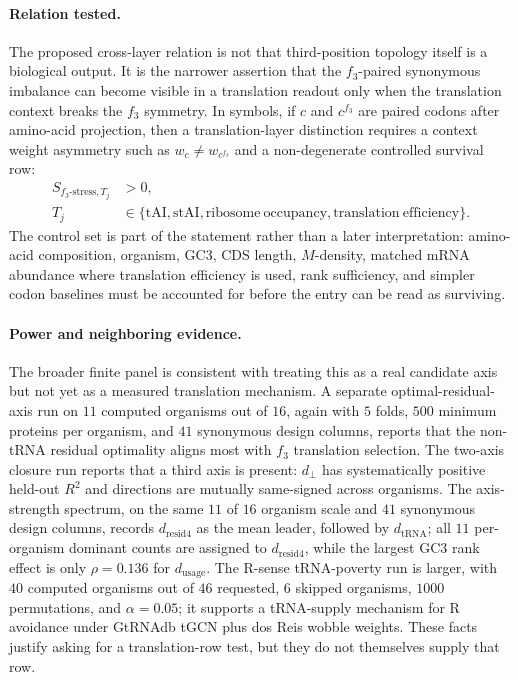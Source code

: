 \paragraph{Relation tested.}
The proposed cross-layer relation is not that third-position topology itself is a biological output.  It is the narrower assertion that the $f_3$-paired synonymous imbalance can become visible in a translation readout only when the translation context breaks the $f_3$ symmetry.  In symbols, if $c$ and $c^{f_3}$ are paired codons after amino-acid projection, then a translation-layer distinction requires a context weight asymmetry such as $w_c \ne w_{c^{f_3}}$ and a non-degenerate controlled survival row:
$$\begin{aligned}
S_{f_3\text{-stress},T_j} &> 0,\\
T_j &\in \{\mathrm{tAI},\mathrm{stAI},\mathrm{ribosome\ occupancy},\mathrm{translation\ efficiency}\}.
\end{aligned}$$
The control set is part of the statement rather than a later interpretation: amino-acid composition, organism, GC3, CDS length, $M$-density, matched mRNA abundance where translation efficiency is used, rank sufficiency, and simpler codon baselines must be accounted for before the entry can be read as surviving.

\paragraph{Power and neighboring evidence.}
The broader finite panel is consistent with treating this as a real candidate axis but not yet as a measured translation mechanism.  A separate optimal-residual-axis run on $11$ computed organisms out of $16$, again with $5$ folds, $500$ minimum proteins per organism, and $41$ synonymous design columns, reports that the non-tRNA residual optimality aligns most with $f_3$ translation selection.  The two-axis closure run reports that a third axis is present: $d_{\perp}$ has systematically positive held-out $R^2$ and directions are mutually same-signed across organisms.  The axis-strength spectrum, on the same $11$ of $16$ organism scale and $41$ synonymous design columns, records $d_{\mathrm{resid4}}$ as the mean leader, followed by $d_{\mathrm{tRNA}}$; all $11$ per-organism dominant counts are assigned to $d_{\mathrm{resid4}}$, while the largest GC3 rank effect is only $\rho = 0.136$ for $d_{\mathrm{usage}}$.  The R-sense tRNA-poverty run is larger, with $40$ computed organisms out of $46$ requested, $6$ skipped organisms, $1000$ permutations, and $\alpha = 0.05$; it supports a tRNA-supply mechanism for R avoidance under GtRNAdb tGCN plus dos Reis wobble weights.  These facts justify asking for a translation-row test, but they do not themselves supply that row.

